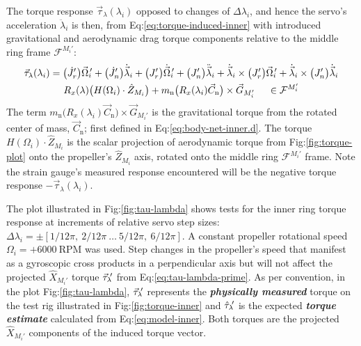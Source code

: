 \par
The torque response $\vec{\tau}_\lambda(\lambda_i)$ opposed to changes of $\Delta\lambda_i$, and hence the servo's acceleration $\ddot{\lambda}_i$ is then, from Eq:\ref{eq:torque-induced-inner} with introduced gravitational and aerodynamic drag torque components relative to the middle ring frame $\mathcal{F}^{M_i'}$:
\begin{multline}\label{eq:model-inner}
\vec{\tau}_\lambda(\lambda_i)=\big(\dot{J}_{r}'\big)\vec{\Omega}_i\text{}\hspace{-2pt}'+\big(\dot{J}_{n}'\big)\dot{\vec{\lambda}}_i+\big(J_r'\big)\dot{\vec{\Omega}}_i\text{}\hspace{-2pt}'+\big(J_{n}'\big)\ddot{\vec{\lambda}}_i+\dot{\vec{\lambda}}_i\times \big(J_r'\big)\vec{\Omega}_i\text{}\hspace{-2pt}'+\dot{\vec{\lambda}}_i\times \big(J_{n}'\big)\dot{\vec{\lambda}}_i
\\
R_x(\lambda)\big(H(\Omega_i)\cdot\hat{Z}_{M_i}\big)+m_\text{n}\big(R_x(\lambda_i)\vec{C}_{\text{n}}\big)\times\vec{G}_{M_i'}~~~~\in\mathcal{F}^{M_i'}
\end{multline}
The term $m_\text{n}\big(R_x(\lambda_i)\vec{C}_{\text{n}}\big)\times\vec{G}_{M_i'}$ is the gravitational torque from the rotated center of mass, $\vec{C}_{\text{n}}$; first defined in Eq:\ref{eq:body-net-inner.d}. The torque $H(\Omega_i)\cdot\hat{Z}_{M_i}$ is the scalar projection of aerodynamic torque from Fig:\ref{fig:torque-plot} onto the propeller's $\hat{Z}_{M_i}$ axis, rotated onto the middle ring $\mathcal{F}^{M_i'}$ frame. Note the strain gauge's measured response encountered will be the negative torque response $-\vec{\tau}_\lambda(\lambda_i)$.
\par
The plot illustrated in Fig:\ref{fig:tau-lambda} shows tests for the inner ring torque response at increments of relative servo step sizes: $\Delta\lambda_i=\pm[1/12\pi,~2/12\pi~\ldots~5/12\pi,~6/12\pi]$. A constant propeller rotational speed $\Omega_i=+6000~\text{RPM}$ was used. Step changes in the propeller's speed that manifest as a gyroscopic cross products in a perpendicular axis but will not affect the projected $\hat{X}_{M_i'}$ torque $\vec{\tau}_\lambda\text{}\hspace{-2pt}'$ from Eq:\ref{eq:tau-lambda-prime}. As per convention, in the plot Fig:\ref{fig:tau-lambda}, $\vec{\tau}_\lambda\text{}\hspace{-2pt}'$ represents the \emph{\textbf{physically measured}} torque on the test rig illustrated in Fig:\ref{fig:torque-inner} and $\hat{\tau}_\lambda\text{}\hspace{-2pt}'$ is the expected \emph{\textbf{torque estimate}} calculated from Eq:\ref{eq:model-inner}. Both torques are the projected $\hat{X}_{M_i'}$ components of the induced torque vector. 
